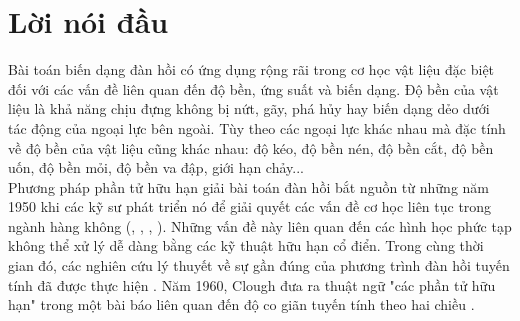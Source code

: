 \documentclass[
12pt, %
oneside, %
english, %
onehalfspacing, %
nolistspacing, %
headsepline, %
addchap,
]{MastersDoctoralThesis} %
\renewcommand{\baselinestretch}{1.5}
\begin{document}
\renewcommand{\baselinestretch}{1.25}
\tableofcontents %
\renewcommand{\baselinestretch}{1.5}

\newpage
\listoffigures %

\newpage
\listoftables %


%




\mainmatter 
\thispagestyle{plain}
\chapter*{\centering Lời nói đầu}
Bài toán biến dạng đàn hồi có ứng dụng rộng rãi trong cơ học vật liệu đặc biệt đối với các vấn đề liên quan đến độ bền, ứng suất và biến dạng. Độ bền của vật liệu là khả năng chịu đựng không bị nứt, gãy, phá hủy hay biến dạng dẻo dưới tác động của ngoại lực bên ngoài. Tùy theo các ngoại lực khác nhau mà đặc tính về độ bền của vật liệu cũng khác nhau: độ kéo, độ bền nén, độ bền cắt, độ bền uốn, độ bền mỏi, độ bền va đập, giới hạn chảy...\\
Phương pháp phần tử hữu hạn giải bài toán đàn hồi bắt nguồn từ những năm 1950 khi các kỹ sư phát triển nó để giải quyết các vấn đề cơ học liên tục trong ngành hàng không (\cite{Lev53}, \cite{ArK67}, \cite{ArK66}, \cite{Ode91}). Những vấn đề này liên quan đến các hình học phức tạp không thể xử lý dễ dàng bằng các kỹ thuật hữu hạn cổ điển. Trong cùng thời gian đó, các nghiên cứu lý thuyết về sự gần đúng của phương trình đàn hồi tuyến tính đã được thực hiện \cite{TuC56}. Năm 1960, Clough đưa ra thuật ngữ "các phần tử hữu hạn" trong một bài báo liên quan đến độ co giãn tuyến tính theo hai chiều \cite{Clo60}.
\end{document}
